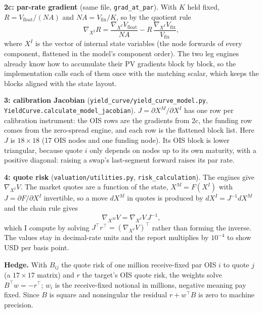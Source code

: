 \documentclass[10pt]{article}
\newcommand{\code}[1]{\texttt{#1}}
\begin{document}
\textbf{2c: par-rate gradient} (same file, \code{grad\_at\_par}). With $K$ held fixed, $R=V_{\mathrm{float}}/(NA)$ and $NA=V_{\mathrm{fix}}/K$, so
by the quotient rule
\[
\nabla_{X^I}R=\frac{\nabla_{X^I}V_{\mathrm{float}}}{NA}-R\,\frac{\nabla_{X^I}V_{\mathrm{fix}}}{V_{\mathrm{fix}}},
\]
where $X^I$ is the vector of internal state variables (the node forwards of every component, flattened in the model's component
order). The two leg engines already know how to accumulate their PV gradients block by block, so the implementation calls each of
them once with the matching scalar, which keeps the blocks aligned with the state layout.

\textbf{3: calibration Jacobian} (\code{yield\_curve/yield\_curve\_model.py}, \code{YieldCurve.calculate\_model\_jacobian}). $J=\partial X^M/\partial X^I$ has one row per
calibration instrument: the OIS rows are the gradients from 2c, the funding row comes from the zero-spread engine, and each row is the
flattened block list. Here $J$ is $18\times18$ (17 OIS nodes and one funding node). Its OIS block is lower triangular, because quote
$i$ only depends on nodes up to its own maturity, with a positive diagonal: raising a swap's last-segment forward raises its par rate.

\textbf{4: quote risk} (\code{valuation/utilities.py}, \code{risk\_calculation}). The engines give $\nabla_{X^I}V$. The market quotes are a function of the state,
$X^M=F(X^I)$ with $J=\partial F/\partial X^I$ invertible, so a move $dX^M$ in quotes is produced by $dX^I=J^{-1}dX^M$ and the chain rule
gives
\[
\nabla_{X^M}V=\nabla_{X^I}V\,J^{-1},
\]
which I compute by solving $J^{\top}r^{\top}=(\nabla_{X^I}V)^{\top}$ rather than forming the inverse. The values stay in decimal-rate
units and the report multiplies by $10^{-4}$ to show USD per basis point.

\textbf{Hedge.} With $B_{ij}$ the quote risk of one million receive-fixed par OIS $i$ to quote $j$ (a $17\times17$ matrix) and $r$ the
target's OIS quote risk, the weights solve $B^{\top}w=-r^{\top}$; $w_i$ is the receive-fixed notional in millions, negative meaning pay
fixed. Since $B$ is square and nonsingular the residual $r+w^{\top}B$ is zero to machine precision.
\end{document}
